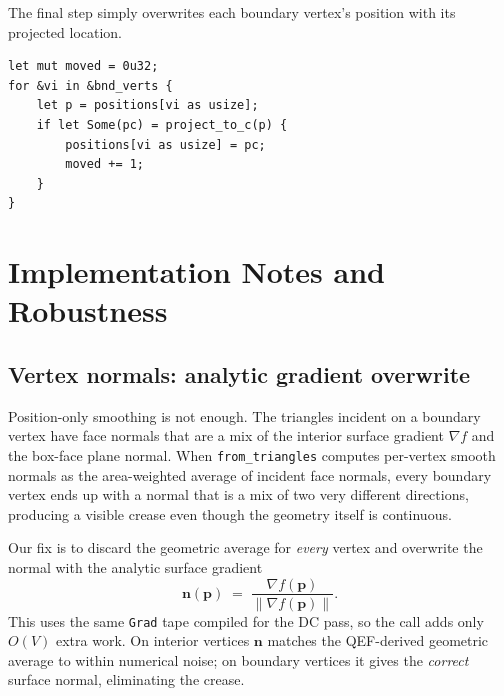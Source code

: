 \documentclass[11pt]{article}
\begin{document}
The final step simply overwrites each boundary vertex's position with its
projected location.

\begin{lstlisting}
let mut moved = 0u32;
for &vi in &bnd_verts {
    let p = positions[vi as usize];
    if let Some(pc) = project_to_c(p) {
        positions[vi as usize] = pc;
        moved += 1;
    }
}
\end{lstlisting}

\section{Implementation Notes and Robustness}

\subsection{Vertex normals: analytic gradient overwrite}

Position-only smoothing is not enough.  The triangles incident on a
boundary vertex have face normals that are a mix of the interior surface
gradient $\nabla f$ and the box-face plane normal.  When
\texttt{from\_triangles} computes per-vertex smooth normals as the
area-weighted average of incident face normals, every boundary vertex
ends up with a normal that is a mix of two very different directions,
producing a visible crease even though the geometry itself is continuous.

Our fix is to discard the geometric average for \emph{every} vertex and
overwrite the normal with the analytic surface gradient
\begin{equation} \label{eq:nrm}
  \mathbf{n}(\mathbf{p}) \;=\; \frac{\nabla f(\mathbf{p})}{\|\nabla f(\mathbf{p})\|}.
\end{equation}
This uses the same \texttt{Grad} tape compiled for the DC pass, so the
call adds only $O(V)$ extra work.  On interior vertices $\mathbf{n}$
matches the QEF-derived geometric average to within numerical noise; on
boundary vertices it gives the \emph{correct} surface normal, eliminating
the crease.
\end{document}

